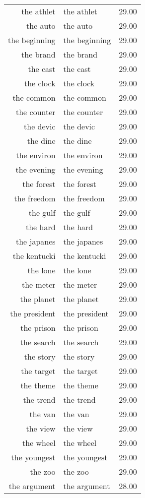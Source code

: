 \begin{table}[ht]
\begin{tabular}{rlr}
  the athlet & the athlet & 29.00 \\ 
  the auto & the auto & 29.00 \\ 
  the beginning & the beginning & 29.00 \\ 
  the brand & the brand & 29.00 \\ 
  the cast & the cast & 29.00 \\ 
  the clock & the clock & 29.00 \\ 
  the common & the common & 29.00 \\ 
  the counter & the counter & 29.00 \\ 
  the devic & the devic & 29.00 \\ 
  the dine & the dine & 29.00 \\ 
  the environ & the environ & 29.00 \\ 
  the evening & the evening & 29.00 \\ 
  the forest & the forest & 29.00 \\ 
  the freedom & the freedom & 29.00 \\ 
  the gulf & the gulf & 29.00 \\ 
  the hard & the hard & 29.00 \\ 
  the japanes & the japanes & 29.00 \\ 
  the kentucki & the kentucki & 29.00 \\ 
  the lone & the lone & 29.00 \\ 
  the meter & the meter & 29.00 \\ 
  the planet & the planet & 29.00 \\ 
  the president & the president & 29.00 \\ 
  the prison & the prison & 29.00 \\ 
  the search & the search & 29.00 \\ 
  the story & the story & 29.00 \\ 
  the target & the target & 29.00 \\ 
  the theme & the theme & 29.00 \\ 
  the trend & the trend & 29.00 \\ 
  the van & the van & 29.00 \\ 
  the view & the view & 29.00 \\ 
  the wheel & the wheel & 29.00 \\ 
  the youngest & the youngest & 29.00 \\ 
  the zoo & the zoo & 29.00 \\ 
  the argument & the argument & 28.00 \\ 

\end{tabular}
\end{table}
